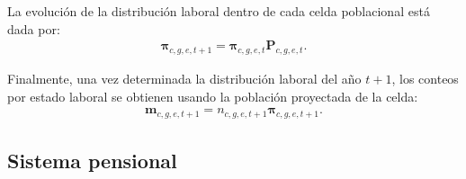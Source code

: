 \documentclass[11pt]{article}
\begin{document}
La evolución de la distribución laboral dentro de cada celda poblacional está dada por:
\begin{align*}
\boldsymbol{\pi}_{c,g,e,t+1}
=
\boldsymbol{\pi}_{c,g,e,t}
\mathbf{P}_{c,g,e,t}.
\end{align*}

Finalmente, una vez determinada la distribución laboral del año \(t+1\), los conteos por estado laboral se obtienen usando la población proyectada de la celda:
\begin{align*}
\mathbf{m}_{c,g,e,t+1}
=
n_{c,g,e,t+1}
\boldsymbol{\pi}_{c,g,e,t+1}.
\end{align*}

\subsection{Sistema pensional}



\end{document}
